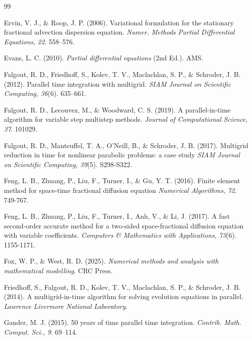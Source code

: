 \begin{thebibliography}{99}
\begin{LTRbibitems}
Ervin, V. J., \& Roop, J. P.
(2006).
Variational formulation for the stationary fractional advection dispersion equation.
\textit{Numer. Methods Partial Differential Equations, 22}.
558–576.

Evans, L. C.
(2010).
\textit{Partial differential equations} (2nd Ed.).
AMS.

Falgout, R. D., Friedhoff, S., Kolev, T. V., Maclachlan, S. P., \& Schroder, J. B.
(2012).
Parallel time integration with multigrid.
\textit{SIAM Journal on Scientific Computing, 36}(6).
635–661.

Falgout, R. D., Lecouvez, M., \& Woodward, C. S.
(2019).
A parallel-in-time algorithm for variable step multistep methods.
\textit{Journal of Computational Science, 37}.
101029.

Falgout, R. D., Manteuffel, T. A., O'Neill, B., \& Schroder, J. B.
(2017).
Multigrid reduction in time for nonlinear parabolic problems: a case study
\textit{SIAM Journal on Scientific Computing, 39}(5).
S298-S322.

Feng, L. B., Zhuang, P., Liu, F., Turner, I., \& Gu, Y. T.
(2016).
Finite element method for space-time fractional diffusion equation
\textit{Numerical Algorithms, 72}.
749-767.

Feng, L. B., Zhuang, P., Liu, F., Turner, I., Anh, V., \& Li, J.
(2017).
A fast second-order accurate method for a two-sided space-fractional diffusion equation with variable coefficients.
\textit{Computers \& Mathematics with Applications, 73}(6).
1155-1171.

Fox, W. P., \& West, R. D.
(2025).
\textit{Numerical methods and analysis with mathematical modelling}.
CRC Press.

Friedhoff, S., Falgout, R. D., Kolev, T. V., Maclachlan, S. P., \& Schroder, J. B.
(2014).
A multigrid-in-time algorithm for solving evolution equations in parallel.
\textit{Lawrence Livermore National Laboratory}.

Gander, M. J.
(2015).
50 years of time parallel time integration.
\textit{Contrib. Math. Comput. Sci., 9}.
69–114.


\end{LTRbibitems}
\end{thebibliography}
